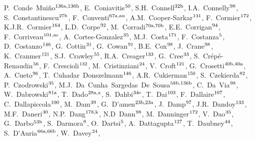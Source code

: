 \begin{flushleft}
P.~Conde~Mui\~no$^\textrm{\scriptsize 136a,136b}$,    
E.~Coniavitis$^\textrm{\scriptsize 50}$,    
S.H.~Connell$^\textrm{\scriptsize 32b}$,    
I.A.~Connelly$^\textrm{\scriptsize 98}$,    
S.~Constantinescu$^\textrm{\scriptsize 27b}$,    
F.~Conventi$^\textrm{\scriptsize 67a,au}$,    
A.M.~Cooper-Sarkar$^\textrm{\scriptsize 131}$,    
F.~Cormier$^\textrm{\scriptsize 172}$,    
K.J.R.~Cormier$^\textrm{\scriptsize 164}$,    
L.D.~Corpe$^\textrm{\scriptsize 92}$,    
M.~Corradi$^\textrm{\scriptsize 70a,70b}$,    
E.E.~Corrigan$^\textrm{\scriptsize 94}$,    
F.~Corriveau$^\textrm{\scriptsize 101,ac}$,    
A.~Cortes-Gonzalez$^\textrm{\scriptsize 35}$,    
M.J.~Costa$^\textrm{\scriptsize 171}$,    
F.~Costanza$^\textrm{\scriptsize 5}$,    
D.~Costanzo$^\textrm{\scriptsize 146}$,    
G.~Cottin$^\textrm{\scriptsize 31}$,    
G.~Cowan$^\textrm{\scriptsize 91}$,    
B.E.~Cox$^\textrm{\scriptsize 98}$,    
J.~Crane$^\textrm{\scriptsize 98}$,    
K.~Cranmer$^\textrm{\scriptsize 121}$,    
S.J.~Crawley$^\textrm{\scriptsize 55}$,    
R.A.~Creager$^\textrm{\scriptsize 133}$,    
G.~Cree$^\textrm{\scriptsize 33}$,    
S.~Cr\'ep\'e-Renaudin$^\textrm{\scriptsize 56}$,    
F.~Crescioli$^\textrm{\scriptsize 132}$,    
M.~Cristinziani$^\textrm{\scriptsize 24}$,    
V.~Croft$^\textrm{\scriptsize 121}$,    
G.~Crosetti$^\textrm{\scriptsize 40b,40a}$,    
A.~Cueto$^\textrm{\scriptsize 96}$,    
T.~Cuhadar~Donszelmann$^\textrm{\scriptsize 146}$,    
A.R.~Cukierman$^\textrm{\scriptsize 150}$,    
S.~Czekierda$^\textrm{\scriptsize 82}$,    
P.~Czodrowski$^\textrm{\scriptsize 35}$,    
M.J.~Da~Cunha~Sargedas~De~Sousa$^\textrm{\scriptsize 58b,136b}$,    
C.~Da~Via$^\textrm{\scriptsize 98}$,    
W.~Dabrowski$^\textrm{\scriptsize 81a}$,    
T.~Dado$^\textrm{\scriptsize 28a,x}$,    
S.~Dahbi$^\textrm{\scriptsize 34e}$,    
T.~Dai$^\textrm{\scriptsize 103}$,    
F.~Dallaire$^\textrm{\scriptsize 107}$,    
C.~Dallapiccola$^\textrm{\scriptsize 100}$,    
M.~Dam$^\textrm{\scriptsize 39}$,    
G.~D'amen$^\textrm{\scriptsize 23b,23a}$,    
J.~Damp$^\textrm{\scriptsize 97}$,    
J.R.~Dandoy$^\textrm{\scriptsize 133}$,    
M.F.~Daneri$^\textrm{\scriptsize 30}$,    
N.P.~Dang$^\textrm{\scriptsize 178,k}$,    
N.D~Dann$^\textrm{\scriptsize 98}$,    
M.~Danninger$^\textrm{\scriptsize 172}$,    
V.~Dao$^\textrm{\scriptsize 35}$,    
G.~Darbo$^\textrm{\scriptsize 53b}$,    
S.~Darmora$^\textrm{\scriptsize 8}$,    
O.~Dartsi$^\textrm{\scriptsize 5}$,    
A.~Dattagupta$^\textrm{\scriptsize 127}$,    
T.~Daubney$^\textrm{\scriptsize 44}$,    
S.~D'Auria$^\textrm{\scriptsize 66a,66b}$,    
W.~Davey$^\textrm{\scriptsize 24}$,    

\end{flushleft}
